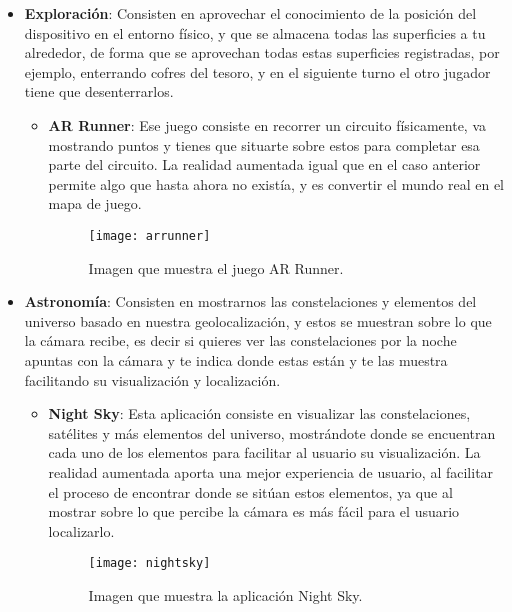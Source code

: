 \begin{itemize}
  \item \textbf{Exploración}: Consisten en aprovechar el conocimiento de la posición del dispositivo en el entorno físico, y que se almacena todas las superficies a tu alrededor, de forma que se aprovechan todas estas superficies registradas, por ejemplo, enterrando cofres del tesoro, y en el siguiente turno el otro jugador tiene que desenterrarlos.

  \begin{itemize}
    \item \textbf{AR Runner}: Ese juego consiste en recorrer un circuito físicamente, va mostrando puntos y tienes que situarte sobre estos para completar esa parte del circuito. La realidad aumentada igual que en el caso anterior permite algo que hasta ahora no existía, y es convertir el mundo real en el mapa de juego.

    \begin{figure}[h]
      \centering
      \texttt{[image: arrunner]}
      \caption{Imagen que muestra el juego AR Runner.\protect\footnotemark}
      \label{figura-ar-runner}
    \end{figure}

  \end{itemize}

  \item \textbf{Astronomía}: Consisten en mostrarnos las constelaciones y elementos del universo basado en nuestra geolocalización, y estos se muestran sobre lo que la cámara recibe, es decir si quieres ver las constelaciones por la noche apuntas con la cámara y te indica donde estas están y te las muestra facilitando su visualización y localización.

  \begin{itemize}
    \item \textbf{Night Sky}: Esta aplicación consiste en visualizar las constelaciones, satélites y más elementos del universo, mostrándote donde se encuentran cada uno de los elementos para facilitar al usuario su visualización. La realidad aumentada aporta una mejor experiencia de usuario, al facilitar el proceso de encontrar donde se sitúan estos elementos, ya que al mostrar sobre lo que percibe la cámara es más fácil para el usuario localizarlo.

    \begin{figure}[h]
      \centering
      \texttt{[image: nightsky]}
      \caption{Imagen que muestra la aplicación Night Sky.\protect\footnotemark}
      \label{figura-night-sky}
    \end{figure}


\end{itemize}
\end{itemize}
